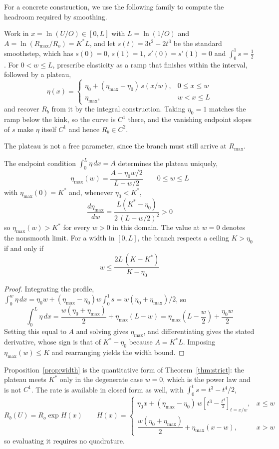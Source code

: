 \documentclass[11pt,a4paper]{article}
\begin{document}
For a concrete construction, we use the following family to compute the headroom required by smoothing.

Work in $x=\ln(U/O)\in[0,L]$ with $L=\ln(1/O)$ and $A=\ln(R_{\max}/R_o)=K^*L$, and let $s(t)=3t^2-2t^3$ be the standard smoothstep, which has $s(0)=0$, $s(1)=1$, $s'(0)=s'(1)=0$ and $\int_0^1 s=\tfrac12$. For $0<w\leq L$, prescribe elasticity as a ramp that finishes within the interval, followed by a plateau,
\[
\boxed{
\eta(x)=
\begin{cases}
\eta_0+(\eta_{\max}-\eta_0)\,s(x/w), & 0\leq x\leq w\\[3pt]
\eta_{\max}, & w<x\leq L
\end{cases}
}
\]
and recover $R_b$ from it by the integral construction. Taking $\eta_0=1$ matches the ramp below the kink, so the curve is $C^1$ there, and the vanishing endpoint slopes of $s$ make $\eta$ itself $C^1$ and hence $R_b\in C^2$.

The plateau is not a free parameter, since the branch must still arrive at $R_{\max}$.

\begin{proposition}
\label{prop:width}
The endpoint condition $\int_0^L\eta\,dx=A$ determines the plateau uniquely,
\[
\boxed{
\eta_{\max}(w)=\frac{A-\eta_0w/2}{L-w/2}
\qquad 0\leq w\leq L
}
\]
with $\eta_{\max}(0)=K^*$ and, whenever $\eta_0<K^*$,
\[
\frac{d\eta_{\max}}{dw}=\frac{L(K^*-\eta_0)}{2\,(L-w/2)^2}>0
\]
so $\eta_{\max}(w)>K^*$ for every $w>0$ in this domain. The value at $w=0$ denotes the nonsmooth limit. For a width in $[0,L]$, the branch respects a ceiling $K>\eta_0$ if and only if
\[
\boxed{
w\leq\frac{2L\,(K-K^*)}{K-\eta_0}
}
\]
\end{proposition}
\begin{proof}
Integrating the profile, $\int_0^w\eta\,dx=\eta_0w+(\eta_{\max}-\eta_0)w\int_0^1s=w(\eta_0+\eta_{\max})/2$, so
\[
\int_0^L\eta\,dx=\frac{w(\eta_0+\eta_{\max})}{2}+\eta_{\max}(L-w)=\eta_{\max}\left(L-\frac{w}{2}\right)+\frac{\eta_0w}{2}
\]
Setting this equal to $A$ and solving gives $\eta_{\max}$, and differentiating gives the stated derivative, whose sign is that of $K^*-\eta_0$ because $A=K^*L$. Imposing $\eta_{\max}(w)\leq K$ and rearranging yields the width bound.
\end{proof}

Proposition~\ref{prop:width} is the quantitative form of Theorem~\ref{thm:strict}: the plateau meets $K^*$ only in the degenerate case $w=0$, which is the power law and is not $C^1$. The rate is available in closed form as well, with $\int_0^t s=t^3-t^4/2$,
\[
R_b(U)=R_o\exp H(x)
\qquad
H(x)=
\begin{cases}
\eta_0x+(\eta_{\max}-\eta_0)\,w\left[t^3-\tfrac{t^4}{2}\right]_{t=x/w}, & x\leq w\\[5pt]
\dfrac{w(\eta_0+\eta_{\max})}{2}+\eta_{\max}(x-w), & x>w
\end{cases}
\]
so evaluating it requires no quadrature.
\end{document}
